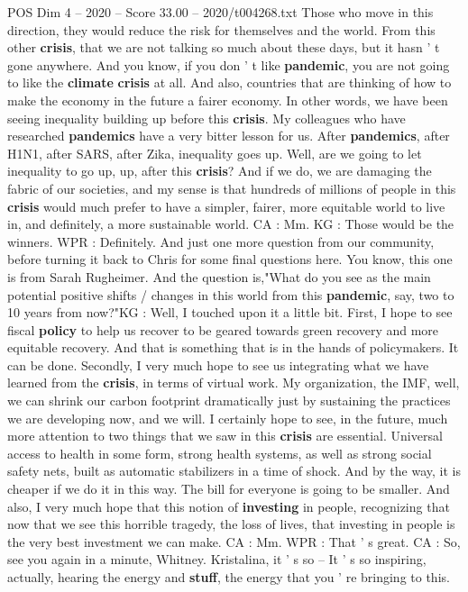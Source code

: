\begin{textsample}{POS Dim 4 – 2020 – Score 33.00 – 2020/t004268.txt}
Those who move in this direction, they would reduce the risk for themselves and the world.
From this other \textbf{crisis}, that we are not talking so much about these days, but it hasn ' t gone anywhere.
And you know, if you don ' t like \textbf{pandemic}, you are not going to like the \textbf{climate} \textbf{crisis} at all.
And also, countries that are thinking of how to make the economy in the future a fairer economy.
In other words, we have been seeing inequality building up before this \textbf{crisis}.
My colleagues who have researched \textbf{pandemics} have a very bitter lesson for us.
After \textbf{pandemics}, after H1N1, after SARS, after Zika, inequality goes up.
Well, are we going to let inequality to go up, up, after this \textbf{crisis}?
And if we do, we are damaging the fabric of our societies, and my sense is that hundreds of millions of people in this \textbf{crisis} would much prefer to have a simpler, fairer, more equitable world to live in, and definitely, a more sustainable world.
CA : Mm.
KG : Those would be the winners.
WPR : Definitely.
And just one more question from our community, before turning it back to Chris for some final questions here.
You know, this one is from Sarah Rugheimer.
And the question is,"What do you see as the main potential positive shifts / changes in this world from this \textbf{pandemic}, say, two to 10 years from now?"KG : Well, I touched upon it a little bit.
First, I hope to see fiscal \textbf{policy} to help us recover to be geared towards green recovery and more equitable recovery.
And that is something that is in the hands of policymakers.
It can be done.
Secondly, I very much hope to see us integrating what we have learned from the \textbf{crisis}, in terms of virtual work.
My organization, the IMF, well, we can shrink our carbon footprint dramatically just by sustaining the practices we are developing now, and we will.
I certainly hope to see, in the future, much more attention to two things that we saw in this \textbf{crisis} are essential.
Universal access to health in some form, strong health systems, as well as strong social safety nets, built as automatic stabilizers in a time of shock.
And by the way, it is cheaper if we do it in this way.
The bill for everyone is going to be smaller.
And also, I very much hope that this notion of \textbf{investing} in people, recognizing that now that we see this horrible tragedy, the loss of lives, that investing in people is the very best investment we can make.
CA : Mm.
WPR : That ' s great.
CA : So, see you again in a minute, Whitney.
Kristalina, it ' s so -- It ' s so inspiring, actually, hearing the energy and \textbf{stuff}, the energy that you ' re bringing to this.

\end{textsample}
